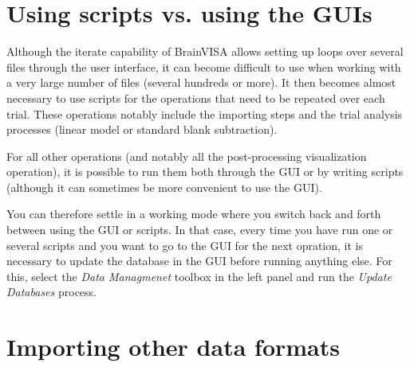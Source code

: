 \section{Using scripts vs. using the GUIs}

Although the iterate capability of BrainVISA allows setting up loops over several files through the user interface, it can become difficult to use when working with a very large number of files (several hundreds or more).
It then becomes almost necessary to use scripts for the operations that need to be repeated over each trial. These operations notably include the importing steps and the trial analysis processes (linear model or standard blank subtraction).

For all other operations (and notably all the post-processing visualization operation), it is possible to run them both through the GUI or by writing scripts (although it can sometimes be more convenient to use the GUI).

You can therefore settle in a working mode where you switch back and forth between using the GUI or scripts. In that case, every time you have run one or several scripts and you want to go to the GUI for the next opration, it is necessary to update the database in the GUI before running anything else. For this, select the \textit{Data Managmenet} toolbox in the left panel and run the \textit{Update Databases} process.

\section{Importing other data formats}

